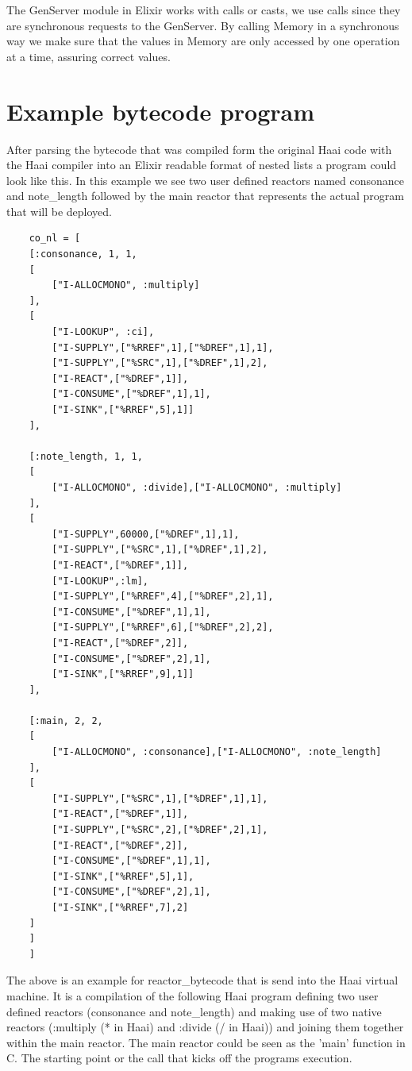\documentclass[a4paper]{book}
\begin{document}
The GenServer module in Elixir works with calls or casts, we use calls since they are synchronous requests to the GenServer. By calling Memory in a synchronous way we make sure that the values in Memory are only accessed by one operation at a time, assuring correct values. 


\section{Example bytecode program}

After parsing the bytecode that was compiled form the original Haai code with the Haai compiler into an Elixir readable format of nested lists a program could look like this. In this example we see two user defined reactors named consonance and note\_length followed by the main reactor that represents the actual program that will be deployed. 

\begin{verbatim}
	co_nl = [
	[:consonance, 1, 1,
	[
	    ["I-ALLOCMONO", :multiply]
	],
	[
	    ["I-LOOKUP", :ci],
	    ["I-SUPPLY",["%RREF",1],["%DREF",1],1],
	    ["I-SUPPLY",["%SRC",1],["%DREF",1],2],
	    ["I-REACT",["%DREF",1]],
	    ["I-CONSUME",["%DREF",1],1],
	    ["I-SINK",["%RREF",5],1]]
	],
	
	[:note_length, 1, 1,
	[
	    ["I-ALLOCMONO", :divide],["I-ALLOCMONO", :multiply]
	],
	[
	    ["I-SUPPLY",60000,["%DREF",1],1],
	    ["I-SUPPLY",["%SRC",1],["%DREF",1],2],
	    ["I-REACT",["%DREF",1]],
	    ["I-LOOKUP",:lm],
	    ["I-SUPPLY",["%RREF",4],["%DREF",2],1],
	    ["I-CONSUME",["%DREF",1],1],
	    ["I-SUPPLY",["%RREF",6],["%DREF",2],2],
	    ["I-REACT",["%DREF",2]],
	    ["I-CONSUME",["%DREF",2],1],
	    ["I-SINK",["%RREF",9],1]]
	],
	
	[:main, 2, 2,
	[
	    ["I-ALLOCMONO", :consonance],["I-ALLOCMONO", :note_length]
	],
	[
	    ["I-SUPPLY",["%SRC",1],["%DREF",1],1],
	    ["I-REACT",["%DREF",1]],
	    ["I-SUPPLY",["%SRC",2],["%DREF",2],1],
	    ["I-REACT",["%DREF",2]],
	    ["I-CONSUME",["%DREF",1],1],
	    ["I-SINK",["%RREF",5],1],
	    ["I-CONSUME",["%DREF",2],1],
	    ["I-SINK",["%RREF",7],2]
	]
	]
	]
\end{verbatim}

The above is an example for reactor\_bytecode that is send into the Haai virtual machine. It is a compilation of the following Haai program defining two user defined reactors (consonance and note\_length) and making use of two native reactors (:multiply (* in Haai) and :divide (/ in Haai)) and joining them together within the main reactor. The main reactor could be seen as the 'main' function in C. The starting point or the call that kicks off the programs execution.
\end{document}
